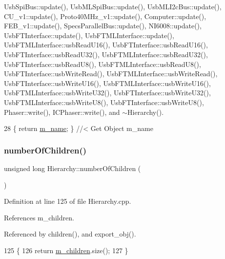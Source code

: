 Usb\+Spi\+Bus\+::update(), Usb\+M\+L\+Spi\+Bus\+::update(), Usb\+M\+L\+I2c\+Bus\+::update(), C\+U\+\_\+v1\+::update(), Proto40\+M\+Hz\+\_\+v1\+::update(), Computer\+::update(), F\+E\+B\+\_\+v1\+::update(), Specs\+Parallel\+Bus\+::update(), N\+I6008\+::update(), Usb\+F\+T\+Interface\+::update(), Usb\+F\+T\+M\+L\+Interface\+::update(), Usb\+F\+T\+M\+L\+Interface\+::usb\+Read\+U16(), Usb\+F\+T\+Interface\+::usb\+Read\+U16(), Usb\+F\+T\+Interface\+::usb\+Read\+U32(), Usb\+F\+T\+M\+L\+Interface\+::usb\+Read\+U32(), Usb\+F\+T\+Interface\+::usb\+Read\+U8(), Usb\+F\+T\+M\+L\+Interface\+::usb\+Read\+U8(), Usb\+F\+T\+Interface\+::usb\+Write\+Read(), Usb\+F\+T\+M\+L\+Interface\+::usb\+Write\+Read(), Usb\+F\+T\+Interface\+::usb\+Write\+U16(), Usb\+F\+T\+M\+L\+Interface\+::usb\+Write\+U16(), Usb\+F\+T\+M\+L\+Interface\+::usb\+Write\+U32(), Usb\+F\+T\+Interface\+::usb\+Write\+U32(), Usb\+F\+T\+M\+L\+Interface\+::usb\+Write\+U8(), Usb\+F\+T\+Interface\+::usb\+Write\+U8(), Phaser\+::write(), I\+C\+Phaser\+::write(), and $\sim$\+Hierarchy().


\begin{DoxyCode}
28 \{ \textcolor{keywordflow}{return} \hyperlink{classObject_a8b83c95c705d2c3ba0d081fe1710f48d}{m\_name}; \} \textcolor{comment}{//< Get Object m\_name}
\end{DoxyCode}
\mbox{\label{classHierarchy_ab16e84de65fd84e14001a6cf941c8be4}} 
\subsubsection{\texorpdfstring{number\+Of\+Children()}{numberOfChildren()}}
{\footnotesize\ttfamily unsigned long Hierarchy\+::number\+Of\+Children (\begin{DoxyParamCaption}{ }\end{DoxyParamCaption})}



Definition at line 125 of file Hierarchy.\+cpp.



References m\+\_\+children.



Referenced by children(), and export\+\_\+obj().


\begin{DoxyCode}
125                                            \{
126   \textcolor{keywordflow}{return} \hyperlink{classHierarchy_a038816763941fd4a930504917f60483b}{m\_children}.size();
127 \}
\end{DoxyCode}
\mbox{\label{classHierarchy_aee461dc930ce3871636ff87f075b1b83}} 
